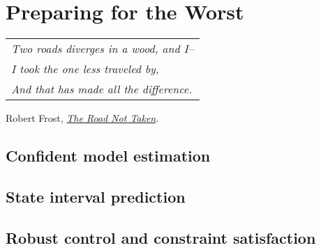 
\chapter{Preparing for the Worst}
\label{chapter:7}

\begin{flushright}
	\begin{tabular}{@{}l@{}}
		\emph{Two roads diverges in a wood, and I--}\\
		\emph{I took the one less traveled by,}\\
		\emph{And that has made all the difference.}\\
	\end{tabular}
	
	Robert Frost, \href{https://eleurent.github.io/sisyphe/texts/the-road-not-taken.html}{\emph{The Road Not Taken}}.
\end{flushright}


\section{Confident model estimation}
\section{State interval prediction}
\section{Robust control and constraint satisfaction}